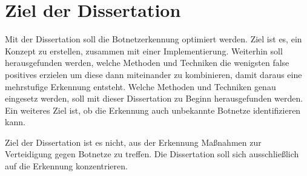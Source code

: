 \section{Ziel der Dissertation}
\label{sec:goals}

Mit der Dissertation soll die Botnetzerkennung optimiert werden. Ziel ist es, ein Konzept zu erstellen, zusammen mit einer Implementierung.
Weiterhin soll herausgefunden werden, welche Methoden und Techniken die wenigsten false positives erzielen um diese dann miteinander zu kombinieren, damit
daraus eine mehrstufige Erkennung entsteht. Welche Methoden und Techniken genau eingesetz werden, soll mit dieser Dissertation zu Beginn herausgefunden werden.
Ein weiteres Ziel ist, ob die Erkennung auch unbekannte Botnetze identifizieren kann.

Ziel der Dissertation ist es nicht, aus der Erkennung Maßnahmen zur Verteidigung gegen Botnetze zu treffen. Die Dissertation soll sich ausschließlich auf die 
Erkennung konzentrieren. 
